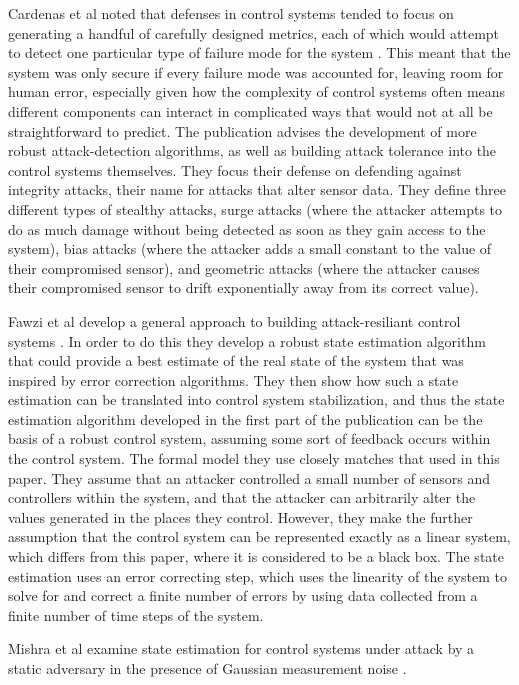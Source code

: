 \documentclass[10pt,twocolumn]{IEEEtran}
\begin{document}
Cardenas et al noted that defenses in control systems tended to focus on generating a handful of carefully designed metrics, each of which would attempt to detect one particular type of failure mode for the system \cite{attacks}.
This meant that the system was only secure if every failure mode was accounted for, leaving room for human error, especially given how the complexity of control systems often means different components can interact in complicated ways that would not at all be straightforward to predict.
The publication advises the development of more robust attack-detection algorithms, as well as building attack tolerance into the control systems themselves.
They focus their defense on defending against integrity attacks, their name for attacks that alter sensor data.
They define three different types of stealthy attacks, surge attacks (where the attacker attempts to do as much damage without being detected as soon as they gain access to the system), bias attacks (where the attacker adds a small constant to the value of their compromised sensor), and geometric attacks (where the attacker causes their compromised sensor to drift exponentially away from its correct value).

Fawzi et al develop a general approach to building attack-resiliant control systems \cite{secureestimation}.
In order to do this they develop a robust state estimation algorithm that could provide a best estimate of the real state of the system that was inspired by error correction algorithms.
They then show how such a state estimation can be translated into control system stabilization, and thus the state estimation algorithm developed in the first part of the publication can be the basis of a robust control system, assuming some sort of feedback occurs within the control system.
The formal model they use closely matches that used in this paper.
They assume that an attacker controlled a small number of sensors and controllers within the system, and that the attacker can arbitrarily alter the values generated in the places they control.
However, they make the further assumption that the control system can be represented exactly as a linear system, which differs from this paper, where it is considered to be a black box.
The state estimation uses an error correcting step, which uses the linearity of the system to solve for and correct a finite number of errors by using data collected from a finite number of time steps of the system.

Mishra et al examine state estimation for control systems under attack by a static adversary in the presence of Gaussian measurement noise \cite{noise}.
\end{document}
